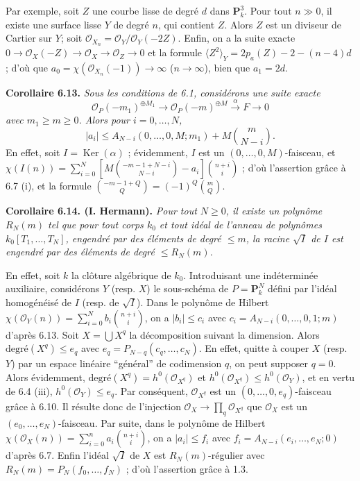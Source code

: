 Par exemple, soit $Z$ une courbe lisse de degr\'e $d$ dans $\mathbf P^3_k$. Pour tout $n\gg0$, il existe une surface lisse $Y$ de degr\'e $n$, qui contient $Z$. Alors $Z$ est un diviseur de Cartier sur $Y$; soit $\mathcal O_{X_n}=\mathcal O_Y/\mathcal O_Y(-2Z)$. Enfin, on a la suite exacte $0\to\mathcal O_X(-Z)\to\mathcal O_X\to\mathcal O_Z\to0$ et la formule $\langle Z^2\rangle_Y=2p_a(Z)-2-(n-4)d$ ; d'o\`u que $a_0=\chi(\mathcal O_{X_n}(-1))\to\infty$ ($n\to\infty$), bien que $a_1=2d$.

\textbf{Corollaire 6.13.} \emph{Sous les conditions de 6.1, consid\'erons une suite exacte}
\[
   \mathcal O_P(-m_1)^{\oplus M_1}\longrightarrow
   \mathcal O_P(-m)^{\oplus M}\xrightarrow{\alpha}F\longrightarrow0
\]
\emph{avec $m_1\ge m\ge0$. Alors pour $i=0,\ldots,N$,}
\[
   |a_i|\le A_{N-i}(0,\ldots,0,M;m_1)+M\binom{m}{N-i}.
\]
En effet, soit $I=\operatorname{Ker}(\alpha)$ ; \'evidemment, $I$ est un $(0,\ldots,0,M)$-faisceau, et $\chi(I(n))=\sum_{i=0}^{N}\left[M\binom{-m-1+N-i}{N-i}-a_i\right]\binom{n+i}{i}$ ; d'o\`u l'assertion gr\^ace \`a 6.7 (i), et la formule $\binom{-m-1+Q}{Q}=(-1)^Q\binom{m}{Q}$.

\textbf{Corollaire 6.14. (I. Hermann).} \emph{Pour tout $N\ge0$, il existe un polyn\^ome $R_N(m)$ tel que pour tout corps $k_0$ et tout id\'eal de l'anneau de polyn\^omes $k_0[T_1,\ldots,T_N]$, engendr\'e par des \'el\'ements de degr\'e $\le m$, la racine $\sqrt I$ de $I$ est engendr\'e par des \'el\'ements de degr\'e $\le R_N(m)$.}

En effet, soit $k$ la cl\^oture alg\'ebrique de $k_0$. Introduisant une ind\'etermin\'ee auxiliaire, consid\'erons $Y$ (resp. $X$) le sous-sch\'ema de $P=\mathbf P^N_k$ d\'efini par l'id\'eal homog\'en\'eis\'e de $I$ (resp. de $\sqrt I$). Dans le polyn\^ome de Hilbert $\chi(\mathcal O_Y(n))=\sum_{i=0}^{N}b_i\binom{n+i}{i}$, on a $|b_i|\le c_i$ avec $c_i=A_{N-i}(0,\ldots,0,1;m)$ d'apr\`es 6.13. Soit $X=\bigcup X^q$ la d\'ecomposition suivant la dimension. Alors $\text{degr\'e}(X^q)\le e_q$ avec $e_q=P_{N-q}(c_q,\ldots,c_N)$. En effet, quitte \`a couper $X$ (resp. $Y$) par un espace lin\'eaire ``g\'en\'eral'' de codimension $q$, on peut supposer $q=0$. Alors \'evidemment, $\text{degr\'e}(X^q)=h^0(\mathcal O_{X^q})$ et $h^0(\mathcal O_{X^q})\le h^0(\mathcal O_Y)$, et en vertu de 6.4 (iii), $h^0(\mathcal O_Y)\le e_q$. Par cons\'equent, $\mathcal O_{X^q}$ est un $(0,\ldots,0,e_q)$-faisceau gr\^ace \`a 6.10. Il r\'esulte donc de l'injection $\mathcal O_X\to \prod_q\mathcal O_{X^q}$ que $\mathcal O_X$ est un $(e_0,\ldots,e_N)$-faisceau. Par suite, dans le polyn\^ome de Hilbert $\chi(\mathcal O_X(n))=\sum_{i=0}^{n}a_i\binom{n+i}{i}$, on a $|a_i|\le f_i$ avec $f_i=A_{N-i}(e_i,\ldots,e_N;0)$ d'apr\`es 6.7. Enfin l'id\'eal $\sqrt I$ de $X$ est $R_N(m)$-r\'egulier avec $R_N(m)=P_N(f_0,\ldots,f_N)$ ; d'o\`u l'assertion gr\^ace \`a 1.3.


